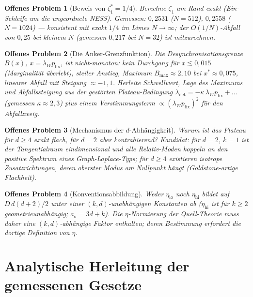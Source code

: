 \documentclass[11pt,a4paper]{article}
\newtheorem{vermutung}{Offenes Problem}
\theoremstyle{remark}
\begin{document}
\begin{vermutung}[Beweis von $\zeta_1^\ast=1/4$]
Berechne $\zeta_1$ am Rand exakt (Ein-Schleife um die ungeordnete NESS).
Gemessen: $0{,}2531$ ($N=512$), $0{,}2558$ ($N=1024$) --- konsistent mit
exakt $1/4$ im Limes $N\to\infty$; der $O(1/N)$-Abfall von $0{,}25$ bei
kleinem $N$ (gemessen $0{,}217$ bei $N=32$) ist mitzurechnen.
\end{vermutung}

\begin{vermutung}[Die Anker-Grenzfunktion]
Die Desynchronisationsgrenze $B(x)$, $x=\lambda_Wp_{\mathrm{fix}}$, ist
\emph{nicht-monoton}: kein Durchgang für $x\lesssim0{,}015$ (Marginalität
überlebt), steiler Anstieg, Maximum $B_{\max}\approx2{,}10$ bei
$x^\ast\approx0{,}075$, linearer Abfall mit Steigung $\approx-1{,}1$.
Herleite Schwellwert, Lage des Maximums und Abfallssteigung aus der
gestörten Plateau-Bedingung
$\lambda_{\mathrm{det}}=-\kappa\,\lambda_Wp_{\mathrm{fix}}+\ldots$
(gemessen $\kappa\approx2{,}3$) plus einem Verstimmungsterm
$\propto(\lambda_Wp_{\mathrm{fix}})^2$ für den Abfallzweig.
\end{vermutung}

\begin{vermutung}[Mechanismus der $d$-Abhängigkeit]
Warum ist das Plateau für $d\ge4$ exakt flach, für $d=2$ aber kontrahierend?
Kandidat: für $d=2$, $k=1$ ist der Tangentialraum eindimensional und alle
Relativ-Moden koppeln an den positive Spektrum eines Graph-Laplace-Typs;
für $d\ge4$ existieren isotrope Zusatzrichtungen, deren oberster Modus am
Nullpunkt hängt (Goldstone-artige Flachheit).
\end{vermutung}

\begin{vermutung}[Konventionsabbildung]
Weder $\eta_{\mathrm{lo}}$ noch $\eta_{\mathrm{hi}}$ bildet auf
$D\,d(d{+}2)/2$ unter einer $(k,d)$-unabhängigen Konstanten ab
($\eta_{\mathrm{hi}}$ ist für $k\ge2$ geometrieunabhängig; $a_\sigma=3d+k$).
Die $\eta$-Normierung der Quell-Theorie muss daher eine
$(k,d)$-abhängige Faktor enthalten; deren Bestimmung erfordert die dortige
Definition von $\eta$.
\end{vermutung}

\section{Analytische Herleitung der gemessenen Gesetze}\label{sec:herleitung}
\end{document}
